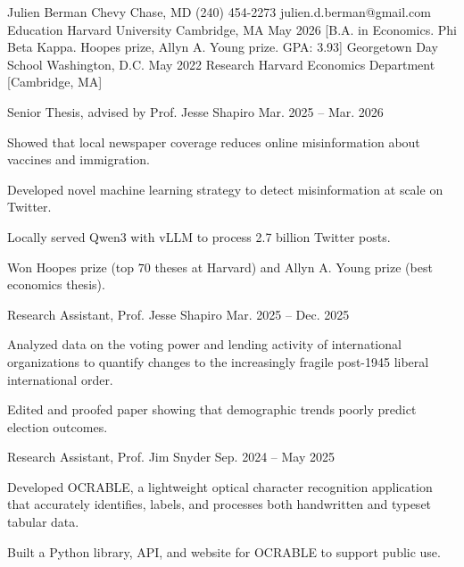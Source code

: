 \documentclass[11pt,a4paper]{article}
\begin{document}
\Header
    {Julien Berman}
    {Chevy Chase, MD}
    {(240) 454-2273}
    {julien.d.berman@gmail.com}
\SectionHeader
    {Education}
\EducationEntry
    {Harvard University}
    {Cambridge, MA}
    {May 2026}
    [B.A. in Economics. Phi Beta Kappa. Hoopes prize, Allyn A. Young prize. GPA: 3.93]
\EducationEntry
    {Georgetown Day School}
    {Washington, D.C.}
    {May 2022}
\SectionHeader
    {Research}
\Entry
    {Harvard Economics Department}
    [Cambridge, MA]
    {
        \Position
            {Senior Thesis, advised by Prof. Jesse Shapiro}
            {Mar. 2025 -- Mar. 2026}
            {
                \item Showed that local newspaper coverage reduces online misinformation about vaccines and immigration.
                \item Developed novel machine learning strategy to detect misinformation at scale on Twitter.
                \item Locally served Qwen3 with vLLM to process 2.7 billion Twitter posts.
                \item Won Hoopes prize (top $70$ theses at Harvard) and Allyn A. Young prize (best economics thesis).
            }
        \Position
            {Research Assistant, Prof. Jesse Shapiro}
            {Mar. 2025 -- Dec. 2025}
            {
                \item Analyzed data on the voting power and lending activity of international organizations to quantify changes to the increasingly fragile post-1945 liberal international order.
                \item Edited and proofed paper showing that demographic trends poorly predict election outcomes.
            }
        \Position
            {Research Assistant, Prof. Jim Snyder}
            {Sep. 2024 -- May 2025}
            {
                \item Developed OCRABLE, a lightweight optical character recognition application that accurately identifies, labels, and processes both handwritten and typeset tabular data.
                \item Built a Python library, API, and website for OCRABLE to support public use.
            }
    }
\end{document}
